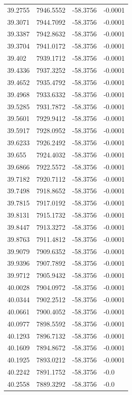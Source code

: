 \begin{table}[H]
\begin{tabular}{llll}
39.2755 & 7946.5552 & -58.3756 & -0.0001 \\
39.3071 & 7944.7092 & -58.3756 & -0.0001 \\
39.3387 & 7942.8632 & -58.3756 & -0.0001 \\
39.3704 & 7941.0172 & -58.3756 & -0.0001 \\
39.402 & 7939.1712 & -58.3756 & -0.0001 \\
39.4336 & 7937.3252 & -58.3756 & -0.0001 \\
39.4652 & 7935.4792 & -58.3756 & -0.0001 \\
39.4968 & 7933.6332 & -58.3756 & -0.0001 \\
39.5285 & 7931.7872 & -58.3756 & -0.0001 \\
39.5601 & 7929.9412 & -58.3756 & -0.0001 \\
39.5917 & 7928.0952 & -58.3756 & -0.0001 \\
39.6233 & 7926.2492 & -58.3756 & -0.0001 \\
39.655 & 7924.4032 & -58.3756 & -0.0001 \\
39.6866 & 7922.5572 & -58.3756 & -0.0001 \\
39.7182 & 7920.7112 & -58.3756 & -0.0001 \\
39.7498 & 7918.8652 & -58.3756 & -0.0001 \\
39.7815 & 7917.0192 & -58.3756 & -0.0001 \\
39.8131 & 7915.1732 & -58.3756 & -0.0001 \\
39.8447 & 7913.3272 & -58.3756 & -0.0001 \\
39.8763 & 7911.4812 & -58.3756 & -0.0001 \\
39.9079 & 7909.6352 & -58.3756 & -0.0001 \\
39.9396 & 7907.7892 & -58.3756 & -0.0001 \\
39.9712 & 7905.9432 & -58.3756 & -0.0001 \\
40.0028 & 7904.0972 & -58.3756 & -0.0001 \\
40.0344 & 7902.2512 & -58.3756 & -0.0001 \\
40.0661 & 7900.4052 & -58.3756 & -0.0001 \\
40.0977 & 7898.5592 & -58.3756 & -0.0001 \\
40.1293 & 7896.7132 & -58.3756 & -0.0001 \\
40.1609 & 7894.8672 & -58.3756 & -0.0001 \\
40.1925 & 7893.0212 & -58.3756 & -0.0001 \\
40.2242 & 7891.1752 & -58.3756 & -0.0 \\
40.2558 & 7889.3292 & -58.3756 & -0.0 \\

\end{tabular}
\end{table}

